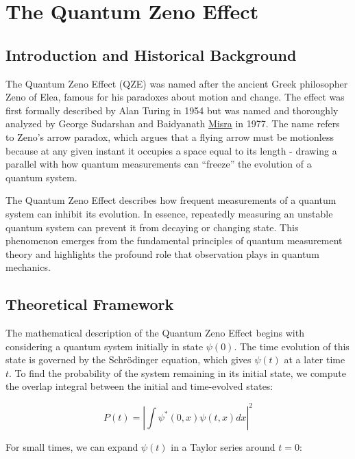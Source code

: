 \documentclass[
  a4paper,
]{book}
\begin{document}
\chapter{The Quantum Zeno Effect}\label{the-quantum-zeno-effect}

\section{Introduction and Historical
Background}\label{introduction-and-historical-background}

The Quantum Zeno Effect (QZE) was named after the ancient Greek
philosopher Zeno of Elea, famous for his paradoxes about motion and
change. The effect was first formally described by Alan Turing in 1954
but was named and thoroughly analyzed by George Sudarshan and Baidyanath
\href{https://pubs.aip.org/aip/jmp/article-abstract/18/4/756/225634/The-Zeno-s-paradox-in-quantum-theory?redirectedFrom=fulltext}{Misra}
in 1977. The name refers to Zeno's arrow paradox, which argues that a
flying arrow must be motionless because at any given instant it occupies
a space equal to its length - drawing a parallel with how quantum
measurements can ``freeze'' the evolution of a quantum system.

The Quantum Zeno Effect describes how frequent measurements of a quantum
system can inhibit its evolution. In essence, repeatedly measuring an
unstable quantum system can prevent it from decaying or changing state.
This phenomenon emerges from the fundamental principles of quantum
measurement theory and highlights the profound role that observation
plays in quantum mechanics.

\section{Theoretical Framework}\label{theoretical-framework}

The mathematical description of the Quantum Zeno Effect begins with
considering a quantum system initially in state \(\psi(0)\). The time
evolution of this state is governed by the Schrödinger equation, which
gives \(\psi(t)\) at a later time \(t\). To find the probability of the
system remaining in its initial state, we compute the overlap integral
between the initial and time-evolved states:

\[P(t) = \left|\int \psi^*(0,x)\psi(t,x)dx\right|^2\]

For small times, we can expand \(\psi(t)\) in a Taylor series around
\(t=0\):
\end{document}
